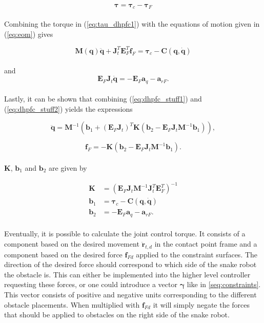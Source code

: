 \begin{equation}\label{eq:tau_dhpfc1}
    \boldsymbol{\tau} = \boldsymbol{\tau}_c - \boldsymbol{\tau}_F
\end{equation}
\\

Combining the torque in (\ref{eq:tau_dhpfc1}) with the equations of motion given in (\ref{eq:eom}) gives

\begin{equation}\label{eq:dhpfc_stuff1}
    \mathbf{M(q) \ddot{q}} + \mathbf{J}_t^T \mathbf{E}^T_F \mathbf{f}_F = \boldsymbol{\tau}_c - \mathbf{C(q, \dot{q})}
\end{equation}
\\
and
\begin{equation}\label{eq:dhpfc_stuff2}
    \mathbf{E}_F \mathbf{J}_t\mathbf{\ddot{q}} = - \mathbf{E}_F \mathbf{a}_q - \mathbf{a}_{rF}.
\end{equation}
\\
Lastly, it can be shown that combining (\ref{eq:dhpfc_stuff1}) and (\ref{eq:dhpfc_stuff2}) yields the expressions

\begin{equation}
    \mathbf{\ddot{q}} = \mathbf{M}^{-1}(\mathbf{b}_1 + (\mathbf{E}_F \mathbf{J}_t)^T \mathbf{K} (\mathbf{b}_2 - \mathbf{E}_F \mathbf{J}_t \mathbf{M}^{-1} \mathbf{b}_1)),
\end{equation}

\begin{equation}
    \mathbf{f}_F = -\mathbf{K} (\mathbf{b}_2 - \mathbf{E}_F \mathbf{J}_t \mathbf{M}^{-1} \mathbf{b}_1).
\end{equation}
\\
$\mathbf{K}$, $\mathbf{b}_1$ and $\mathbf{b}_2$ are given by

\begin{equation}
    \begin{split}
        \mathbf{K} &= (\mathbf{E}_F \mathbf{J}_t \mathbf{M}^{-1} \mathbf{J}_t^T \mathbf{E}^T_F)^{-1}\\
        \mathbf{b}_1 &= \boldsymbol{\tau}_c - \mathbf{C(q, \dot{q})}\\
        \mathbf{b}_2 &= - \mathbf{E}_F \mathbf{a}_q - \mathbf{a}_{rF}.
    \end{split}
\end{equation}
\\
Eventually, it is possible to calculate the joint control torque. It consists of a component based on the desired movement $\mathbf{\ddot{r}}_{t,d}$ in the contact point frame and a component based on the desired force $\mathbf{f}_{Fd}$ applied to the constraint surfaces. The direction of the desired force should correspond to which side of the snake robot the obstacle is. This can either be implemented into the higher level controller requesting these forces, or one could introduce a vector $\boldsymbol{\gamma}$ like in \ref{seq:constraints}. This vector consists of positive and negative units corresponding to the different obstacle placements. When multiplied with $\mathbf{f}_{Fd}$ it will simply negate the forces that should be applied to obstacles on the right side of the snake robot.

